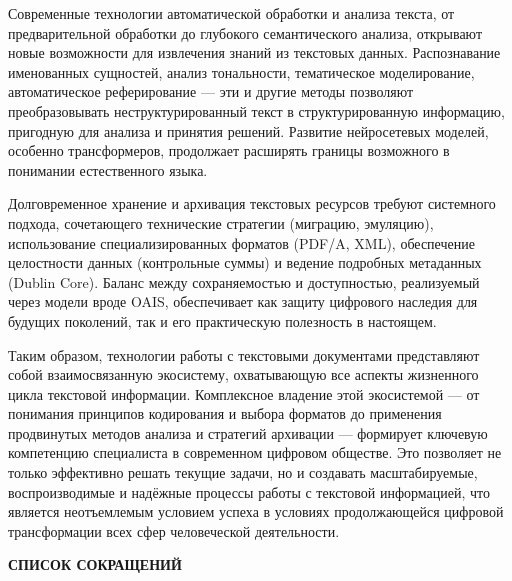 \documentclass{SibFU-docs}
\begin{document}
Современные технологии автоматической обработки и анализа текста, от предварительной обработки до глубокого семантического анализа, открывают новые возможности для извлечения знаний из текстовых данных. Распознавание именованных сущностей, анализ тональности, тематическое моделирование, автоматическое реферирование — эти и другие методы позволяют преобразовывать неструктурированный текст в структурированную информацию, пригодную для анализа и принятия решений. Развитие нейросетевых моделей, особенно трансформеров, продолжает расширять границы возможного в понимании естественного языка.

Долговременное хранение и архивация текстовых ресурсов требуют системного подхода, сочетающего технические стратегии (миграцию, эмуляцию), использование специализированных форматов (PDF/A, XML), обеспечение целостности данных (контрольные суммы) и ведение подробных метаданных (Dublin Core). Баланс между сохраняемостью и доступностью, реализуемый через модели вроде OAIS, обеспечивает как защиту цифрового наследия для будущих поколений, так и его практическую полезность в настоящем.

Таким образом, технологии работы с текстовыми документами представляют собой взаимосвязанную экосистему, охватывающую все аспекты жизненного цикла текстовой информации. Комплексное владение этой экосистемой — от понимания принципов кодирования и выбора форматов до применения продвинутых методов анализа и стратегий архивации — формирует ключевую компетенцию специалиста в современном цифровом обществе. Это позволяет не только эффективно решать текущие задачи, но и создавать масштабируемые, воспроизводимые и надёжные процессы работы с текстовой информацией, что является неотъемлемым условием успеха в условиях продолжающейся цифровой трансформации всех сфер человеческой деятельности.

\newpage
\begin{center}\textbf{СПИСОК СОКРАЩЕНИЙ}\end{center}
{}

\vspace{1em}
\end{document}
